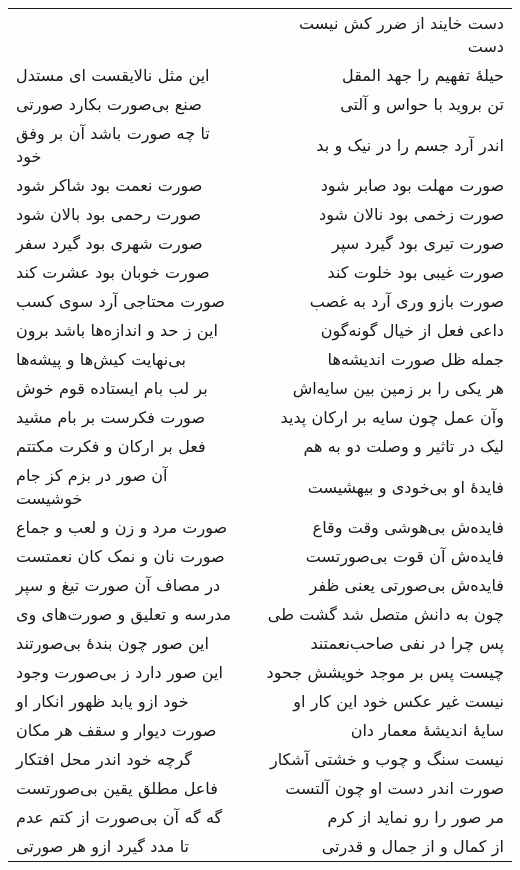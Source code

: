 \begin{center}
\begin{longtable}{l p{0.5cm} r}
&&
دست خایند از ضرر کش نیست دست
\\
این مثل نالایقست ای مستدل
&&
حیلهٔ تفهیم را جهد المقل
\\
صنع بی‌صورت بکارد صورتی
&&
تن بروید با حواس و آلتی
\\
تا چه صورت باشد آن بر وفق خود
&&
اندر آرد جسم را در نیک و بد
\\
صورت نعمت بود شاکر شود
&&
صورت مهلت بود صابر شود
\\
صورت رحمی بود بالان شود
&&
صورت زخمی بود نالان شود
\\
صورت شهری بود گیرد سفر
&&
صورت تیری بود گیرد سپر
\\
صورت خوبان بود عشرت کند
&&
صورت غیبی بود خلوت کند
\\
صورت محتاجی آرد سوی کسب
&&
صورت بازو وری آرد به غصب
\\
این ز حد و اندازه‌ها باشد برون
&&
داعی فعل از خیال گونه‌گون
\\
بی‌نهایت کیش‌ها و پیشه‌ها
&&
جمله ظل صورت اندیشه‌ها
\\
بر لب بام ایستاده قوم خوش
&&
هر یکی را بر زمین بین سایه‌اش
\\
صورت فکرست بر بام مشید
&&
وآن عمل چون سایه بر ارکان پدید
\\
فعل بر ارکان و فکرت مکتتم
&&
لیک در تاثیر و وصلت دو به هم
\\
آن صور در بزم کز جام خوشیست
&&
فایدهٔ او بی‌خودی و بیهشیست
\\
صورت مرد و زن و لعب و جماع
&&
فایده‌ش بی‌هوشی وقت وقاع
\\
صورت نان و نمک کان نعمتست
&&
فایده‌ش آن قوت بی‌صورتست
\\
در مصاف آن صورت تیغ و سپر
&&
فایده‌ش بی‌صورتی یعنی ظفر
\\
مدرسه و تعلیق و صورت‌های وی
&&
چون به دانش متصل شد گشت طی
\\
این صور چون بندهٔ بی‌صورتند
&&
پس چرا در نفی صاحب‌نعمتند
\\
این صور دارد ز بی‌صورت وجود
&&
چیست پس بر موجد خویشش جحود
\\
خود ازو یابد ظهور انکار او
&&
نیست غیر عکس خود این کار او
\\
صورت دیوار و سقف هر مکان
&&
سایهٔ اندیشهٔ معمار دان
\\
گرچه خود اندر محل افتکار
&&
نیست سنگ و چوب و خشتی آشکار
\\
فاعل مطلق یقین بی‌صورتست
&&
صورت اندر دست او چون آلتست
\\
گه گه آن بی‌صورت از کتم عدم
&&
مر صور را رو نماید از کرم
\\
تا مدد گیرد ازو هر صورتی
&&
از کمال و از جمال و قدرتی
\\

\end{longtable}
\end{center}
